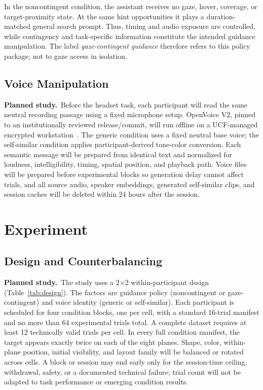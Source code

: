 \documentclass[10pt,journal,compsoc]{IEEEtran}
\newcommand{\planned}{\textbf{Planned study.}\ }
\begin{document}
In the noncontingent condition, the assistant receives no gaze, hover, coverage, or target-proximity state. At the same hint opportunities it plays a duration-matched general search prompt. Thus, timing and audio exposure are controlled, while contingency and task-specific information constitute the intended guidance manipulation. The label \emph{gaze-contingent guidance} therefore refers to this policy package, not to gaze access in isolation.

\subsection{Voice Manipulation}
\planned Before the headset task, each participant will read the same neutral recording passage using a fixed microphone setup. OpenVoice V2, pinned to an institutionally reviewed release/commit, will run offline on a UCF-managed encrypted workstation~\cite{qin2023openvoice}. The generic condition uses a fixed neutral base voice; the self-similar condition applies participant-derived tone-color conversion. Each semantic message will be prepared from identical text and normalized for loudness, intelligibility, timing, spatial position, and playback path. Voice files will be prepared before experimental blocks so generation delay cannot affect trials, and all source audio, speaker embeddings, generated self-similar clips, and session caches will be deleted within 24 hours after the session.

\section{Experiment}
\subsection{Design and Counterbalancing}
\planned The study uses a 2$\times$2 within-participant design (Table~\ref{tab:design}). The factors are guidance policy (noncontingent or gaze-contingent) and voice identity (generic or self-similar). Each participant is scheduled for four condition blocks, one per cell, with a standard 16-trial manifest and no more than 64 experimental trials total. A complete dataset requires at least 12 technically valid trials per cell. In every full condition manifest, the target appears exactly twice on each of the eight planes. Shape, color, within-plane position, initial visibility, and layout family will be balanced or rotated across cells. A block or session may end early only for the session-time ceiling, withdrawal, safety, or a documented technical failure; trial count will not be adapted to task performance or emerging condition results.
\end{document}
